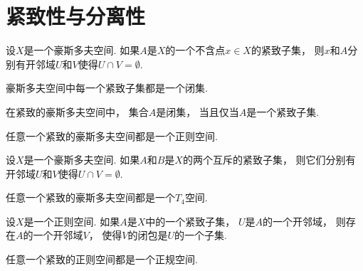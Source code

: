 \section{紧致性与分离性}
\begin{theorem}
设\(X\)是一个豪斯多夫空间.
如果\(A\)是\(X\)的一个不含点\(x \in X\)的紧致子集，
则\(x\)和\(A\)分别有开邻域\(U\)和\(V\)使得\(U \cap V = \emptyset\).
\end{theorem}

\begin{corollary}
豪斯多夫空间中每一个紧致子集都是一个闭集.
\end{corollary}

\begin{corollary}
在紧致的豪斯多夫空间中，
集合\(A\)是闭集，
当且仅当\(A\)是一个紧致子集.
\end{corollary}

\begin{corollary}
任意一个紧致的豪斯多夫空间都是一个正则空间.
\end{corollary}

\begin{theorem}
设\(X\)是一个豪斯多夫空间.
如果\(A\)和\(B\)是\(X\)的两个互斥的紧致子集，
则它们分别有开邻域\(U\)和\(V\)使得\(U \cap V = \emptyset\).
\end{theorem}

\begin{corollary}
任意一个紧致的豪斯多夫空间都是一个\(T_4\)空间.
\end{corollary}

\begin{theorem}
设\(X\)是一个正则空间.
如果\(A\)是\(X\)中的一个紧致子集，
\(U\)是\(A\)的一个开邻域，
则存在\(A\)的一个开邻域\(V\)，
使得\(V\)的闭包是\(U\)的一个子集.
\end{theorem}

\begin{proposition}
任意一个紧致的正则空间都是一个正规空间.
\end{proposition}

